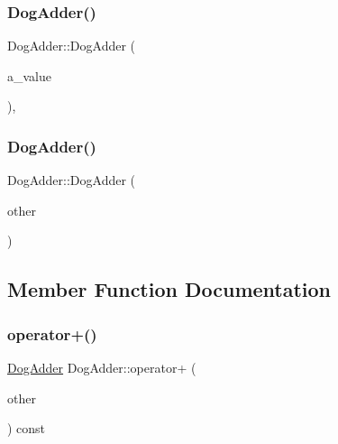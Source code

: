 \mbox{\label{class_dog_adder_a7fd76a2078834dc255c7dd7ac7c58f32}} 
\subsubsection{\texorpdfstring{DogAdder()}{DogAdder()}\hspace{0.1cm}{\footnotesize\ttfamily [5/6]}}
{\footnotesize\ttfamily Dog\+Adder\+::\+Dog\+Adder (\begin{DoxyParamCaption}\item[{const char $\ast$}]{a\+\_\+value }\end{DoxyParamCaption})\hspace{0.3cm}{\ttfamily [inline]}, {\ttfamily [explicit]}}

\mbox{\label{class_dog_adder_a35bb24b649b63f38784dcb44d55c4d94}} 
\subsubsection{\texorpdfstring{DogAdder()}{DogAdder()}\hspace{0.1cm}{\footnotesize\ttfamily [6/6]}}
{\footnotesize\ttfamily Dog\+Adder\+::\+Dog\+Adder (\begin{DoxyParamCaption}\item[{const \mbox{\hyperlink{class_dog_adder}{Dog\+Adder}} \&}]{other }\end{DoxyParamCaption})\hspace{0.3cm}{\ttfamily [inline]}}



\subsection{Member Function Documentation}
\mbox{\label{class_dog_adder_ad667166cdafb4352396e910faf09a55f}} 
\subsubsection{\texorpdfstring{operator+()}{operator+()}\hspace{0.1cm}{\footnotesize\ttfamily [1/3]}}
{\footnotesize\ttfamily \mbox{\hyperlink{class_dog_adder}{Dog\+Adder}} Dog\+Adder\+::operator+ (\begin{DoxyParamCaption}\item[{const \mbox{\hyperlink{class_dog_adder}{Dog\+Adder}} \&}]{other }\end{DoxyParamCaption}) const\hspace{0.3cm}{\ttfamily [inline]}}

